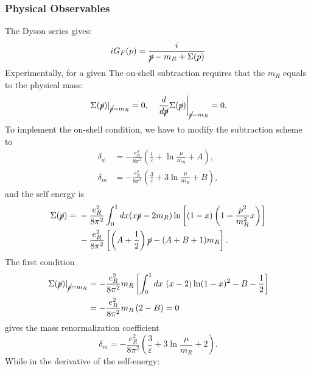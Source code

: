 \documentclass[aps,prb,superscriptaddress,nofootinbib]{revtex4}
\begin{document}
\subsubsection{Physical Observables}

The Dyson series gives:
\begin{equation}
	iG_F(p) = \frac{i}{\cancel p - m_R + \Sigma(p)}
\end{equation}
Experimentally, for a given 
The on-shell subtraction requires that the $m_R$ equals to the physical mass:
\begin{equation}
	\left. \Sigma(\cancel p) \right|_{\cancel p=m_R} = 0, \quad 
	\left. \frac{d}{d \cancel p}\Sigma(\cancel p) \right|_{\cancel p=m_R} = 0.
\end{equation}
To implement the on-shell condition, we have to modify the subtraction scheme to
\begin{equation}
\begin{aligned}
	\delta_{\psi} &= -\frac{e_R^2}{8\pi^2}\left(\frac{1}{\varepsilon}+\ln\frac{\mu}{m_R} +A\right), \\
	\delta_m &= -\frac{e_R^2}{8\pi^2}\left(\frac{3}{\varepsilon} + 3\ln\frac{\mu}{m_R} + B\right),
\end{aligned}
\end{equation}
and the self energy is
\begin{equation}
\begin{aligned}
	\Sigma(\cancel p)
	=&\ -\frac{e_R^2}{8\pi^2} \int_0^1 dx(x\cancel{p}-2m_R)\ln\left[(1-x)\left(1- \frac{p^2}{m_R^2} x \right)\right]\\
	&\  -\frac{e_R^2}{8\pi^2} \left[\left(A+\frac{1}{2}\right)\cancel p - (A+B+1)m_R\right].
\end{aligned}
\end{equation}
The first condition
\begin{equation}
\begin{aligned}
	\left. \Sigma(\cancel p) \right|_{\cancel p=m_R}
	&= -\frac{e_R^2}{8\pi^2} m_R \left[\int_0^1 dx\ (x-2) \ln(1-x)^2 - B-\frac{1}{2}\right] \\
	&= -\frac{e_R^2}{8\pi^2} m_R \left(2 - B\right) = 0
\end{aligned}
\end{equation}
gives the mass renormalization coefficient
\begin{equation}
	\delta_m = -\frac{e_R^2}{8\pi^2}\left(\frac{3}{\varepsilon} + 3\ln\frac{\mu}{m_R} + 2\right).
\end{equation}
While in the derivative of the self-energy:
\end{document}
